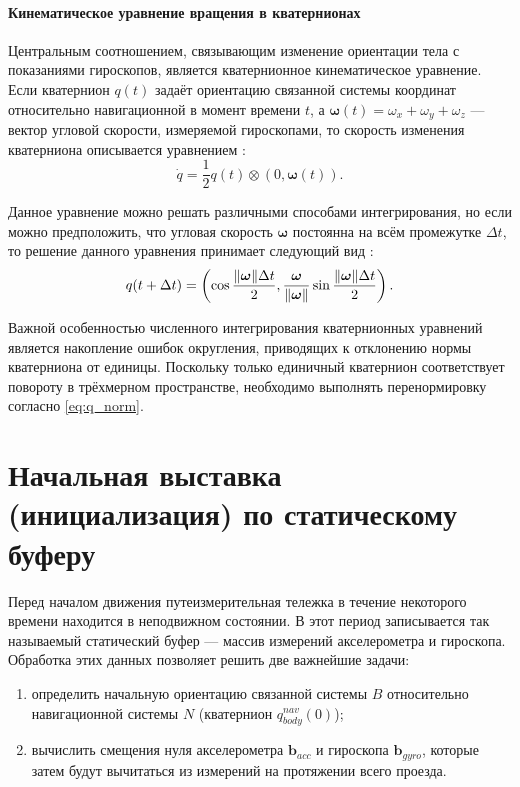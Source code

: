\paragraph{Кинематическое уравнение вращения в кватернионах}
Центральным соотношением, связывающим изменение ориентации тела с показаниями гироскопов, является кватернионное кинематическое уравнение. Если кватернион $q(t)$ задаёт ориентацию связанной системы координат относительно навигационной в момент времени $t$, а $\bm{\omega}(t) = \omega_x + \omega_y + \omega_z$ — вектор угловой скорости, измеряемой гироскопами, то скорость изменения кватерниона описывается уравнением \cite{lurie1961analiticheskaya}:
\begin{equation}
	\label{eq:q_kinematic_eq}
	\dot{q} = \frac{1}{2} q(t) \otimes (0, \bm{\omega}(t)) \text{.}
\end{equation}

Данное уравнение можно решать различными способами интегрирования, но если можно предположить, что угловая скорость $\bm{\omega}$ постоянна на всём промежутке $\Delta t$, то решение данного уравнения принимает следующий вид \cite{lurie1961analiticheskaya}:
\begin{equation}
	\label{eq:delta_q}
	q(t + \Delta t) = \left( \cos \frac{\norm{\bm{\omega}} \Delta t}{2}, \frac{\bm{\omega}}{\norm{\bm{\omega}}} \sin \frac{\norm{\bm{\omega}} \Delta t}{2} \right) \text{.}
\end{equation}

Важной особенностью численного интегрирования кватернионных уравнений является накопление ошибок округления, приводящих к отклонению нормы кватерниона от единицы. Поскольку только единичный кватернион соответствует повороту в трёхмерном пространстве, необходимо выполнять перенормировку согласно \eqref{eq:q_norm}.


\section{Начальная выставка (инициализация) по статическому буферу}
\label{sec:initial_alignment}

Перед началом движения путеизмерительная тележка в течение некоторого времени находится в неподвижном состоянии. В этот период записывается так называемый статический буфер — массив измерений акселерометра и гироскопа. Обработка этих данных позволяет решить две важнейшие задачи:
\begin{enumerate}
	\item определить начальную ориентацию связанной системы \(B\) относительно навигационной системы \(N\) (кватернион \(q_{body}^{nav}(0)\));
	\item вычислить смещения нуля акселерометра \(\bm{b}_{acc}\) и гироскопа \(\bm{b}_{gyro}\), которые затем будут вычитаться из измерений на протяжении всего проезда.
\end{enumerate}

